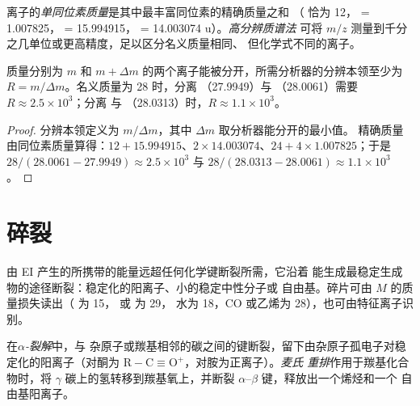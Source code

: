\begin{definition}[精确质量]\label{def:b2:mass-spec-atomic:exact-mass}
离子的\emph{单同位素质量}是其中最丰富同位素的精确质量之和
（ 恰为 12， = 1.007825， = 15.994915，
 = 14.003074 u）。\emph{高分辨质谱法}
可将 $m/z$ 测量到千分之几单位或更高精度，足以区分名义质量相同、
但化学式不同的离子。
\end{definition}

\begin{proposition}[分辨本领]\label{prop:b2:mass-spec-atomic:resolving}
质量分别为 $m$ 和 $m + \Delta m$ 的两个离子能被分开，所需分析器的分辨本领至少为
$R = m/\Delta m$。名义质量为 28 时，分离 （27.9949）与 （28.0061）需要 $R
\approx 2.5 \times 10^3$；分离  与 （28.0313）时，$R \approx 1.1 \times 10^3$。
\end{proposition}

\begin{proof}
分辨本领定义为 $m/\Delta m$，其中 $\Delta m$ 取分析器能分开的最小值。
精确质量由同位素质量算得：$12 + 15.994915$、$2 \times 14.003074$、$24 + 4 \times
1.007825$；于是 $28/(28.0061 - 27.9949) \approx 2.5 \times 10^3$ 与 $28/(28.0313 - 28.0061) \approx
1.1 \times 10^3$。
\end{proof}

\section{碎裂}

由 EI 产生的所携带的能量远超任何化学键断裂所需，它沿着
能生成最稳定生成物的途径断裂：稳定化的阳离子、小的稳定中性分子或
自由基。碎片可由 $M$ 的质量损失读出（ 为 15， 或  为 29，
水为 18，CO 或乙烯为 28），也可由特征离子识别。

\begin{definition}[两种碎裂]\label{def:b2:mass-spec-atomic:fragmentation}
在\emph{$\alpha$-裂解}中，与
杂原子或羰基相邻的碳之间的键断裂，留下由杂原子孤电子对稳定化的阳离子（对酮为
$\mathrm{R{-}C{\equiv}O^+}$，对胺为正离子）。\emph{麦氏
重排}作用于羰基化合物时，将
$\gamma$ 碳上的氢转移到羰基氧上，并断裂 $\alpha$--$\beta$ 键，释放出一个烯烃和一个
自由基阳离子。
\end{definition}

